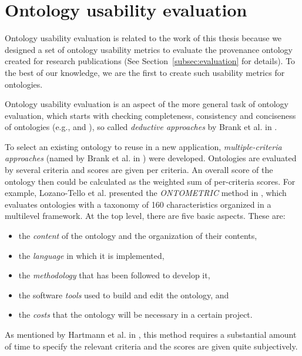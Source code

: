 
\section{Ontology usability evaluation}
Ontology usability evaluation is related to the work of this thesis because we designed a set of ontology usability metrics to evaluate the provenance ontology created for research publications (See Section~\ref{subsec:evaluation} for details). To the best of our knowledge, we are the first to create such usability metrics for ontologies.

Ontology usability evaluation is an aspect of the more general task of ontology evaluation, which starts with checking completeness, consistency and conciseness of ontologies (e.g., \cite{gruninger1995methodology} and \cite{gomez2001evaluation}), so called \emph{deductive approaches} by Brank et al. in \cite{brank2005survey}.

To select an existing ontology to reuse in a new application, \emph{multiple-criteria approaches} (named by Brank et al. in \cite{brank2005survey}) were developed. Ontologies are evaluated by several criteria and scores are given per criteria. An overall score of the ontology then could be calculated as the weighted sum of per-criteria scores. For example, Lozano-Tello et al. presented the \emph{ONTOMETRIC} method in \cite{lozano2003selection,lozano2004ontometric}, which evaluates ontologies with a taxonomy of
160 characteristics organized in a multilevel framework. At the top level, there are five basic aspects. These are: 
\begin{itemize}
	\item the \emph{content} of the ontology and the
	organization of their contents,
	\item the \emph{language}
	in which it is implemented, 
	\item the \emph{methodology}
	that has been followed to develop it,
	\item the software \emph{tools} used to build and edit
	the ontology, and 
	\item the \emph{costs} that the ontology
	will be necessary in a certain project.
\end{itemize} 
As mentioned by Hartmann et al. in \cite{hartmann2005d1}, this method requires a substantial amount of time to specify the relevant criteria and the scores are given quite subjectively.

